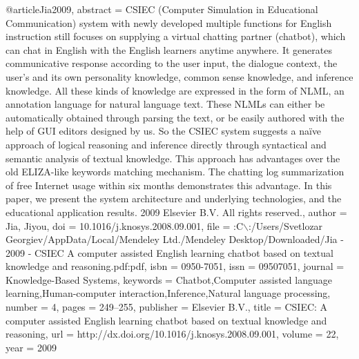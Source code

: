 @article{Jia2009,
      abstract = {CSIEC (Computer Simulation in Educational Communication) system with newly developed multiple functions for English instruction still focuses on supplying a virtual chatting partner (chatbot), which can chat in English with the English learners anytime anywhere. It generates communicative response according to the user input, the dialogue context, the user's and its own personality knowledge, common sense knowledge, and inference knowledge. All these kinds of knowledge are expressed in the form of NLML, an annotation language for natural language text. These NLMLs can either be automatically obtained through parsing the text, or be easily authored with the help of GUI editors designed by us. So the CSIEC system suggests a na{\"{i}}ve approach of logical reasoning and inference directly through syntactical and semantic analysis of textual knowledge. This approach has advantages over the old ELIZA-like keywords matching mechanism. The chatting log summarization of free Internet usage within six months demonstrates this advantage. In this paper, we present the system architecture and underlying technologies, and the educational application results. {\textcopyright} 2009 Elsevier B.V. All rights reserved.},
      author = {Jia, Jiyou},
      doi = {10.1016/j.knosys.2008.09.001},
      file = {:C$\backslash$:/Users/Svetlozar Georgiev/AppData/Local/Mendeley Ltd./Mendeley Desktop/Downloaded/Jia - 2009 - CSIEC A computer assisted English learning chatbot based on textual knowledge and reasoning.pdf:pdf},
      isbn = {0950-7051},
      issn = {09507051},
      journal = {Knowledge-Based Systems},
      keywords = {Chatbot,Computer assisted language learning,Human-computer interaction,Inference,Natural language processing},
      number = {4},
      pages = {249--255},
      publisher = {Elsevier B.V.},
      title = {{CSIEC: A computer assisted English learning chatbot based on textual knowledge and reasoning}},
      url = {http://dx.doi.org/10.1016/j.knosys.2008.09.001},
      volume = {22},
      year = {2009}
}
